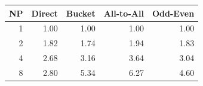 \begin{tabular}{rrrrr}
  \toprule
  NP & Direct & Bucket & All-to-All & Odd-Even \\
  \midrule
  1 & 1.00 & 1.00 & 1.00 & 1.00 \\
  2 & 1.82 & 1.74 & 1.94 & 1.83 \\
  4 & 2.68 & 3.16 & 3.64 & 3.04 \\
  8 & 2.80 & 5.34 & 6.27 & 4.60 \\
  \bottomrule
\end{tabular}
